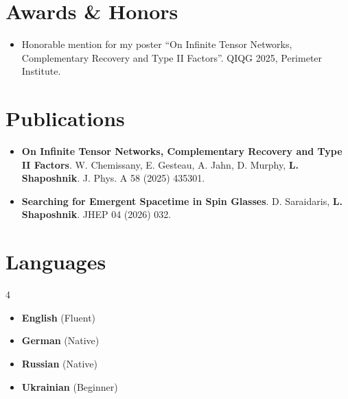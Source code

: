 \documentclass[11pt,a4paper]{moderncv}
\begin{document}
\section{Awards \& Honors}
\vspace*{-2mm}
\begin{itemize}[leftmargin=0.6cm, label=\textbullet]
	\setlength\itemsep{0.2em}
	\item Honorable mention for my poster ``On Infinite Tensor Networks, Complementary Recovery and Type II Factors''. QIQG 2025, Perimeter Institute.
\end{itemize}
\newpage
\section{Publications}
\vspace*{-2mm}
\begin{itemize}[leftmargin=0.6cm, label=\textbullet]
	\setlength\itemsep{0.2em}
	\item \textbf{On Infinite Tensor Networks, Complementary Recovery and Type II Factors}. W. Chemissany, E. Gesteau, A. Jahn, D. Murphy, \textbf{L. Shaposhnik}. J. Phys. A 58 (2025) 435301.
	\item \textbf{Searching for Emergent Spacetime in Spin Glasses}. D. Saraidaris, \textbf{L. Shaposhnik}. JHEP 04 (2026) 032.
\end{itemize}

\section{Languages}
\vspace*{-2mm}
\setlength{\columnsep}{8pt} %
\begin{multicols}{4}
\begin{itemize}[label=\textbullet, leftmargin=*, nosep, topsep=0pt, partopsep=0pt, parsep=0pt, itemsep=0pt]
	\item \textbf{English} (Fluent)
	\item \textbf{German} (Native)
	\item \textbf{Russian} (Native)
	\item \textbf{Ukrainian} (Beginner)
\end{itemize}
\end{multicols}
\end{document}
